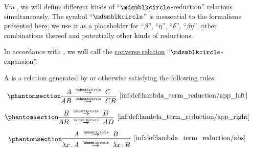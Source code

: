 \begin{definition}\label{def:lambda_term_reduction}
  Via , we will define different kinds of \enquote{\( {\Anon} \)-reduction} relations simultaneously. The symbol \enquote{\( {\Anon} \)} is inessential to the formalisms presented here; we use it as a placeholder for \enquote{\( \beta \)}, \enquote{\( \eta \)}, \enquote{\( \delta \)}, \enquote{\( \beta\eta \)}, other combinations thereof and potentially other kinds of reductions.

  In accordance with , we will call the \hyperref[def:binary_relation/converse]{converse relation} \enquote{\( {\Anon} \)-expansion}.

  \begin{thmenum}
     A  is a relation generated by or otherwise satisfying the following rules:
    \begin{paracol}{3}
      \begin{nthcolumn}{0}
        \ParacolAlignmentHack
        \begin{equation*}\taglabel[\ensuremath{ \logic{App}_{\Anon}^L }]{inf:def:lambda_term_reduction/app_left}
          \begin{prooftree}
            \hypo{ A \pred C }
            \infer1[\ref{inf:def:lambda_term_reduction/app_left}]{ AB \pred CB }
          \end{prooftree}
        \end{equation*}
      \end{nthcolumn}

      \begin{nthcolumn}{1}
        \ParacolAlignmentHack
        \begin{equation*}\taglabel[\ensuremath{ \logic{App}_{\Anon}^R }]{inf:def:lambda_term_reduction/app_right}
          \begin{prooftree}
            \hypo{ B \pred D }
            \infer1[\ref{inf:def:lambda_term_reduction/app_right}]{ AB \pred AD }
          \end{prooftree}
        \end{equation*}
      \end{nthcolumn}

      \begin{nthcolumn}{2}
        \ParacolAlignmentHack
        \begin{equation*}\taglabel[\ensuremath{ \logic{Abs}_{\Anon} }]{inf:def:lambda_term_reduction/abs}
          \begin{prooftree}
            \hypo{ A \pred B }
            \infer1[\ref{inf:def:lambda_term_reduction/abs}]{ \qabs x A \pred \qabs x B }
          \end{prooftree}
        \end{equation*}
      \end{nthcolumn}
    \end{paracol}


\end{thmenum}
\end{definition}
